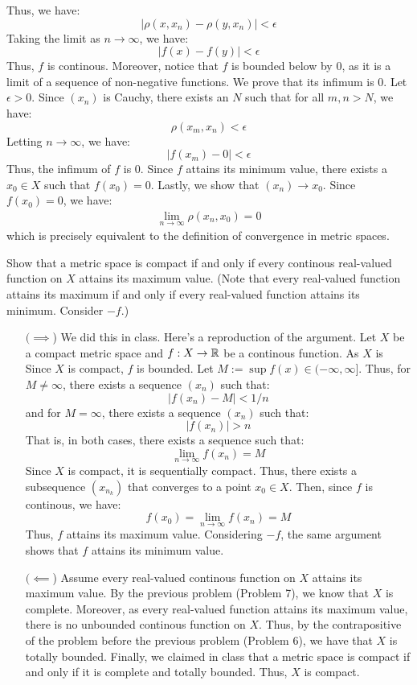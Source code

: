 \documentclass[12pt]{article}
\begin{document}
\begin{solution}
    Thus, we have:
    \[ |\rho(x, x_n) - \rho(y, x_n)| < \epsilon\]
    Taking the limit as $n \to \infty$, we have:
    \[|f(x) - f(y) | < \epsilon\]
    Thus, $f$ is continous. \bbni
    Moreover, notice that $f$ is bounded below by $0$, as it is a limit of a sequence of non-negative functions. We prove that its infimum is $0$. Let $\epsilon > 0$. Since $(x_n)$ is Cauchy, there exists an $N$ such that for all $m, n > N$, we have: 
    \[\rho(x_m, x_n) < \epsilon\]
    Letting $n \to \infty$, we have:
    \[|f(x_m) - 0| < \epsilon \]
    Thus, the infimum of $f$ is $0$. Since $f$ attains its minimum value, there exists a $x_0 \in X$ such that $f(x_0) = 0$. \bbni 
    Lastly, we show that $(x_n) \to x_0$. Since $f(x_0) = 0$, we have:
    \begin{align*}
        \lim_{n\to \infty} \rho(x_n, x_0) = 0
    \end{align*}
    which is precisely equivalent to the definition of convergence in metric spaces.
\end{solution}
\newpage

\begin{problem}{8}
    Show that a metric space is compact if and only if every continous real-valued function on $X$ attains its maximum value. (Note that every real-valued function attains its maximum if and only if every real-valued function attains its minimum. Consider $-f$.)
\end{problem}
\begin{solution}
    \bbni
    \begin{itemize}
        \item[$(\implies$)] We did this in class. Here's a reproduction of the argument. Let $X$ be a compact metric space and $f: X \to \mathbb R$ be a continous function. As $X$ is  Since $X$ is compact, $f$ is bounded.  Let $M := \sup f(x) \in (-\infty, \infty]$. Thus, for $M \neq \infty$, there exists a sequence $(x_n)$ such that: 
        \[ |f(x_n) - M| < 1/n\]
        and for $M = \infty$, there exists a sequence $(x_n)$ such that:
        \[|f(x_n)| > n\]
        That is, in both cases, there exists a sequence such that:
        \[\lim_{n \to \infty} f(x_n) = M \]
        Since $X$ is compact, it is sequentially compact. Thus, there exists a subsequence $(x_{n_k})$ that converges to a point $x_0 \in X$. \bbni 
        Then, since $f$ is continous, we have: 
        \[ f(x_0) = \lim_{n\to\infty} f(x_n) = M \]
        Thus, $f$ attains its maximum value. Considering $-f$, the same argument shows that $f$ attains its minimum value. 
        \item[$(\impliedby$)] Assume every real-valued continous function on $X$ attains its maximum value. By the previous problem (Problem 7), we know that $X$ is complete. Moreover, as every real-valued function attains its maximum value, there is no unbounded continous function on $X$. Thus, by the contrapositive of the problem before the previous problem (Problem 6), we have that $X$ is totally bounded. Finally, we claimed in class that a metric space is compact if and only if it is complete and totally bounded. Thus, $X$ is compact.        
    \end{itemize}
\end{solution}
\newpage 
\end{document}
